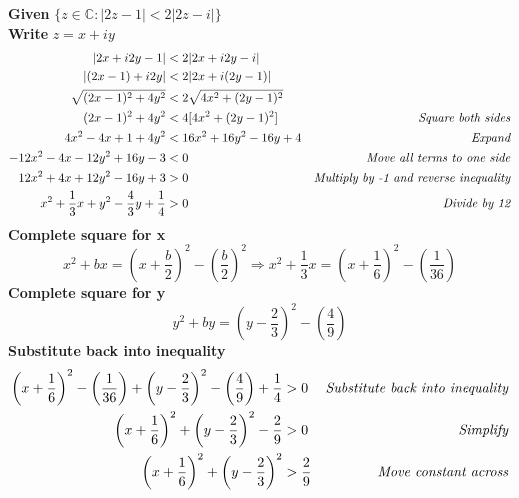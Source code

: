 \documentclass[a4paper, 8pt]{extarticle}
\begin{document}
\begin{examplebox}[2022 Q1(a), 2021 Q1(d), 2017 Q1(a), 2016 Q1(a)]

    \textbf{Given} $\{ z \in \mathbb{C} : |2z - 1| < 2|2z-i|\}$ \\
    \textbf{Write} $z = x + iy$
    \begin{align*}
        |2x + i2y -1 |                                        & < 2 |2x + i2y - i|                                                        \\
        |(2x -1) + i2y|                                       & < 2 |2x + i(2y -1)|                                                       \\
        \sqrt{(2x-1)^2 + 4y^2}                                & < 2 \sqrt{4x^2 + (2y-1)^2}                                                \\
        (2x-1)^2 + 4y^2                                       & < 4[4x^2 + (2y-1)^2]       & \emph{Square both sides}                     \\
        4x^2 - 4x + 1 + 4y^2                                  & < 16x^2 + 16y^2 -16y +4    & \emph{Expand}                                \\
        -12x^2 - 4x - 12y^2 + 16y -3                          & < 0                        & \emph{Move all terms to one side}            \\
        12x^2 + 4x + 12y^2 - 16y + 3                          & > 0                        & \emph{Multiply by -1 and reverse inequality} \\
        x^2 + \frac{1}{3}x + y^2 - \frac{4}{3}y + \frac{1}{4} & > 0                        & \emph{Divide by 12}                          \\
    \end{align*}
    \textbf{Complete square for x}
    $$x^2 + bx = \left(x + \frac{b}{2}\right)^2 - \left(\frac{b}{2}\right)^2 \Rightarrow x^2 + \frac{1}{3}x = \left(x + \frac{1}{6}\right)^2 - \left(\frac{1}{36}\right)$$
    \textbf{Complete square for y}
    $$y^2 + by = \left(y - \frac{2}{3}\right)^2 - \left(\frac{4}{9}\right)$$
    \textbf{Substitute back into inequality}
    \begin{align*}
        \left(x + \frac{1}{6}\right)^2 - \left(\frac{1}{36}\right) + \left(y - \frac{2}{3}\right)^2 - \left(\frac{4}{9}\right)  + \frac{1}{4} & > 0            & \emph{Substitute back into inequality} \\
        \left(x + \frac{1}{6}\right)^2 + \left(y - \frac{2}{3}\right)^2 - \frac{2}{9}                                                         & > 0            & \emph{Simplify}                        \\
        \left(x + \frac{1}{6}\right)^2 + \left(y - \frac{2}{3}\right)^2                                                                       & >  \frac{2}{9} & \emph{Move constant across}            \\
    \end{align*}


\end{examplebox}
\end{document}
